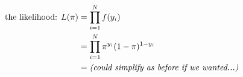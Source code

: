 \documentclass[border=3bp,varwidth=6.5in]{standalone}
\begin{document}
\begin{align}
\text{the likelihood: } L(\pi)
  &= \prod_{i=1}^N f(y_i) \nonumber\\
  &= \prod_{i=1}^N \pi^{y_i} (1 - \pi)^{1 - y_i}\nonumber\\
  &= \text{\textit{(could simplify as before if we wanted...)}} \nonumber
\end{align}
\end{document}
